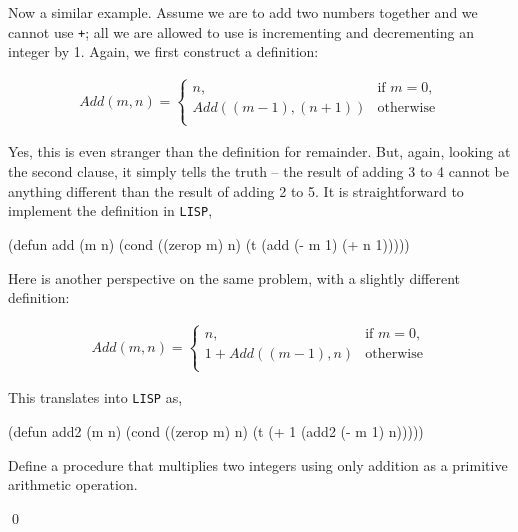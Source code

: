 \documentclass[a4paper,11pt]{article}
\begin{document}
\begin{uenum}
\item Now a similar example. Assume we are to add two numbers together and we cannot use \Verb=+=; all we are allowed to use is incrementing and decrementing an integer by 1. Again, we first construct a definition:

\begin{align}
Add(m,n) =  
\begin{cases}
n, & \text{if } m = 0, \\
Add((m - 1),(n + 1)) & \text{otherwise}\\
\end{cases}
\end{align}

Yes, this is even stranger than the definition for remainder. But, again, looking at the second clause, it simply tells the truth -- the result of adding 3 to 4 cannot be anything different than the result of adding 2 to 5. It is straightforward to implement the definition in \Verb+LISP+,

\begin{lispcode}
(defun add (m n)
  (cond  ((zerop m) n)
         (t (add (- m 1) (+ n 1)))))
\end{lispcode}

\item Here is another perspective on the same problem, with a slightly different definition:

\begin{align}
Add(m,n) =  
\begin{cases}
n, & \text{if } m = 0, \\
	1 + Add((m - 1),n) & \text{otherwise}\\
\end{cases}
\end{align}

This translates into \Verb+LISP+ as,

\begin{lispcode}
(defun add2 (m n)
  (cond ((zerop m) n)
        (t (+ 1 (add2 (- m 1) n)))))
\end{lispcode}

\end{uenum}

\noindent\hrulefill

\begin{uexercise}
Define a procedure that multiplies two integers using only addition as a primitive arithmetic operation.

\qed
\end{uexercise}
\end{document}
